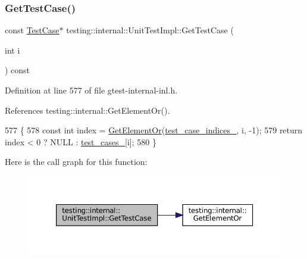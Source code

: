\subsubsection{\texorpdfstring{Get\+Test\+Case()}{GetTestCase()}\hspace{0.1cm}{\footnotesize\ttfamily [1/2]}}
{\footnotesize\ttfamily const \hyperlink{classtesting_1_1TestCase}{Test\+Case}$\ast$ testing\+::internal\+::\+Unit\+Test\+Impl\+::\+Get\+Test\+Case (\begin{DoxyParamCaption}\item[{int}]{i }\end{DoxyParamCaption}) const\hspace{0.3cm}{\ttfamily [inline]}}



Definition at line 577 of file gtest-\/internal-\/inl.\+h.



References testing\+::internal\+::\+Get\+Element\+Or().


\begin{DoxyCode}
577                                            \{
578     \textcolor{keyword}{const} \textcolor{keywordtype}{int} index = \hyperlink{namespacetesting_1_1internal_a71fdd20a0686bea3dc0cdcd95e0bca1c}{GetElementOr}(\hyperlink{classtesting_1_1internal_1_1UnitTestImpl_a9b30891f1a9d5b5c25de2bef0f0bb49a}{test\_case\_indices\_}, i, -1);
579     \textcolor{keywordflow}{return} index < 0 ? NULL : \hyperlink{classtesting_1_1internal_1_1UnitTestImpl_a79ec0f733ada2898efd1a7fbd8587fb3}{test\_cases\_}[i];
580   \}
\end{DoxyCode}
Here is the call graph for this function\+:
\nopagebreak
\begin{figure}[H]
\begin{center}
\leavevmode
\includegraphics[width=350pt]{classtesting_1_1internal_1_1UnitTestImpl_a6438e18ea4904d239a3db7b036a52229_cgraph}
\end{center}
\end{figure}
\mbox{\label{classtesting_1_1internal_1_1UnitTestImpl_ac5684d824a59e963cb3274c79d0b6df3}} 

